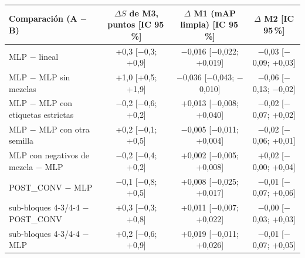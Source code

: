 \begin{tabular}{lccc}
\toprule
Comparaci\'on (A $-$ B) & $\Delta S$ de M3, puntos [IC 95\,\%] & $\Delta$ M1 (mAP limpia) [IC 95\,\%] & $\Delta$ M2 [IC 95\,\%]\\
\midrule
MLP $-$ lineal & +0{,}3 [$-$0{,}3; +0{,}9] & $-$0{,}016 [$-$0{,}022; +0{,}019] & $-$0{,}03 [$-$0{,}09; +0{,}03]\\
MLP $-$ MLP sin mezclas & +1{,}0 [+0{,}5; +1{,}9] & $-$0{,}036 [$-$0{,}043; $-$0{,}010] & $-$0{,}06 [$-$0{,}13; $-$0{,}02]\\
MLP $-$ MLP con etiquetas estrictas & $-$0{,}2 [$-$0{,}6; +0{,}2] & +0{,}013 [$-$0{,}008; +0{,}040] & $-$0{,}02 [$-$0{,}07; +0{,}02]\\
MLP $-$ MLP con otra semilla & +0{,}2 [$-$0{,}1; +0{,}5] & $-$0{,}005 [$-$0{,}011; +0{,}004] & $-$0{,}02 [$-$0{,}06; +0{,}01]\\
MLP con negativos de mezcla $-$ MLP & $-$0{,}2 [$-$0{,}4; +0{,}2] & +0{,}002 [$-$0{,}005; +0{,}008] & +0{,}02 [$-$0{,}00; +0{,}04]\\
POST\_CONV $-$ MLP & $-$0{,}1 [$-$0{,}8; +0{,}5] & +0{,}008 [$-$0{,}025; +0{,}017] & $-$0{,}01 [$-$0{,}07; +0{,}06]\\
sub-bloques 4-3/4-4 $-$ POST\_CONV & +0{,}3 [$-$0{,}3; +0{,}8] & +0{,}011 [$-$0{,}007; +0{,}022] & $-$0{,}00 [$-$0{,}03; +0{,}03]\\
sub-bloques 4-3/4-4 $-$ MLP & +0{,}2 [$-$0{,}6; +0{,}9] & +0{,}019 [$-$0{,}011; +0{,}026] & $-$0{,}01 [$-$0{,}07; +0{,}05]\\
\bottomrule
\end{tabular}
